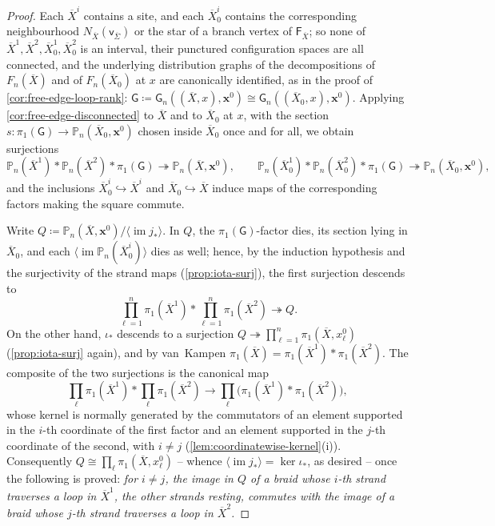 \documentclass[reqno]{amsart}
\theoremstyle{definition}
\newcommand\bfx{\mathbf{x}}
\newcommand\sfG{\mathsf{G}}
\newcommand\sfv{\mathsf{v}}
\newcommand{\PB}{\mathbb{P}}
\newcommand{\im}{\operatorname{im}}
\newcommand{\co}[1]{\mathopen{\langle}#1\mathclose{\rangle}} %
\newcommand{\base}{\bfx^0}
\renewcommand{\bar}{\overline}
\numberwithin{equation}{section}
\begin{document}
\begin{proof}
Each \(\bar X^i\) contains a site, and each \(\bar X^i_0\)
contains the corresponding neighbourhood
\(N_{\bar X}(\sfv_{\bar\Sigma})\) or the star of a branch vertex of
\(\mathsf{F}_{\bar X}\); so none of
\(\bar X^1,\bar X^2,\bar X^1_0,\bar X^2_0\) is an interval,
their punctured configuration spaces are all connected, and the
underlying distribution graphs of the decompositions of
\(F_n(\bar X)\) and of \(F_n(\bar X_0)\) at \(x\) are
canonically identified, as in the proof of
\cref{cor:free-edge-loop-rank}:
\(\sfG\coloneqq\sfG_n((\bar X,x),\base)\cong
\sfG_n((\bar X_0,x),\base)\). Applying
\cref{cor:free-edge-disconnected} to \(\bar X\) and to
\(\bar X_0\) at \(x\), with the section
\(s\colon\pi_1(\sfG)\to\PB_n(\bar X_0,\base)\) chosen inside
\(\bar X_0\) once and for all, we obtain surjections
\[
\PB_n(\bar X^1)\ast\PB_n(\bar X^2)\ast\pi_1(\sfG)
\twoheadrightarrow\PB_n(\bar X,\base),
\qquad
\PB_n(\bar X^1_0)\ast\PB_n(\bar X^2_0)\ast\pi_1(\sfG)
\twoheadrightarrow\PB_n(\bar X_0,\base),
\]
and the inclusions \(\bar X^i_0\hookrightarrow\bar X^i\) and
\(\bar X_0\hookrightarrow\bar X\) induce maps of the
corresponding factors making the square commute.

Write \(Q\coloneqq\PB_n(\bar X,\base)\big/\co{\im j_\ast}\). In
\(Q\), the \(\pi_1(\sfG)\)-factor dies, its section lying in
\(\bar X_0\), and each \(\co{\im\PB_n(\bar X^i_0)}\) dies as
well; hence, by the induction hypothesis and the surjectivity of
the strand maps (\cref{prop:iota-surj}), the first surjection
descends to
\[
\prod_{\ell=1}^n\pi_1(\bar X^1)\ast
\prod_{\ell=1}^n\pi_1(\bar X^2)
\twoheadrightarrow Q.
\]
On the other hand, \(\iota_\ast\) descends to a surjection
\(Q\twoheadrightarrow\prod_{\ell=1}^n\pi_1(\bar X,x^0_\ell)\)
(\cref{prop:iota-surj} again), and by van~Kampen
\(\pi_1(\bar X)=\pi_1(\bar X^1)\ast\pi_1(\bar X^2)\). The
composite of the two surjections is the canonical map
\[
\prod_{\ell}\pi_1(\bar X^1)\ast\prod_{\ell}\pi_1(\bar X^2)
\longrightarrow
\prod_{\ell}\bigl(\pi_1(\bar X^1)\ast\pi_1(\bar X^2)\bigr),
\]
whose kernel is normally generated by the commutators of an
element supported in the \(i\)-th coordinate of the first factor
and an element supported in the \(j\)-th coordinate of the
second, with \(i\neq j\)
(\cref{lem:coordinatewise-kernel}(i)). Consequently
\(Q\cong\prod_\ell\pi_1(\bar X,x^0_\ell)\) -- whence
\(\co{\im j_\ast}=\ker\iota_\ast\), as desired -- once the
following is proved: \emph{for \(i\neq j\), the image in \(Q\)
of a braid whose \(i\)-th strand traverses a loop in
\(\bar X^1\), the other strands resting, commutes with the image
of a braid whose \(j\)-th strand traverses a loop in
\(\bar X^2\).}


\end{proof}
\end{document}

